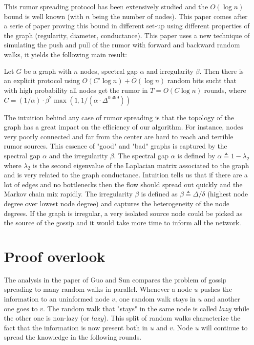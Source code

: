 \documentclass[10pt,journal,a4paper]{IEEEtran}
\begin{document}
This rumor spreading protocol has been extensively studied and the $O(\log n)$ bound is well known (with $n$ being the number of nodes). This paper comes after a serie of paper proving this bound in different set-up using different properties of the graph (regularity, diameter, conductance). This paper uses a new technique of simulating the push and pull of the rumor with forward and backward random walks, it yields the following main result:

\vspace{.3cm}
\begin{theorem}
  Let $G$ be a graph with $n$ nodes, spectral gap $\alpha$ and irregularity $\beta$. Then there is an explicit protocol using $O(C' \log n) + \tilde O(\log n)$ random bits sucht that with high probability all nodes get the rumor in $T=O(C \log n)$ rounds, where $C = (1/\alpha) \cdot \beta^2 \max(1, 1/(\alpha \cdot \Delta ^ {0.499}))$
\end{theorem}
\vspace{.3cm}

The intuition behind any case of rumor spreading is that the topology of the graph has a great impact on the efficiency of our algorithm. For instance, nodes very poorly connected and far from the center are hard to reach and terrible rumor sources. This essence of "good" and "bad" graphs is captured by the spectral gap $\alpha$ and the irregularity $\beta$. The spectral gap $\alpha$ is defined by $\alpha \triangleq 1 - \lambda_2$ where $\lambda_2$ is the second eigenvalue of the Laplacian matrix associated to the graph \cite{jerrum} and is very related to the graph conductance. Intuition tells us that if there are a lot of edges and no bottlenecks then the flow should spread out quickly and the Markov chain mix rapidly. The irregularity $\beta$ is defined as $\beta \triangleq \Delta/\delta$ (highest node degree over lowest node degree) and captures the heterogeneity of the node degrees. If the graph is  irregular, a very isolated source node could be picked as the source of the gossip and it would take more time to inform all the network.

\section{Proof overlook}

The analysis in the paper of Guo and Sun \cite{guosun} compares the problem of gossip spreading to many random walks in parallel. Whenever a node $u$ pushes the information to an uninformed node $v$, one random walk stays in $u$ and another one goes to $v$. The random walk that "stays" in the same node is called $lazy$ while the other one is non-lazy (or $\overline{lazy}$). This split of random walks characterize the fact that the information is now present both in $u$ and $v$. Node $u$ will continue to spread the knowledge in the following rounds.
\end{document}
